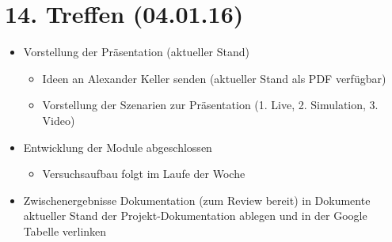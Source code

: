 \section{14. Treffen (04.01.16)}
\begin{itemize}
	\item Vorstellung der Präsentation (aktueller Stand)
	\begin{itemize}
		\item Ideen an Alexander Keller senden (aktueller Stand als PDF verfügbar)
		\item Vorstellung der Szenarien zur Präsentation (1. Live, 2. Simulation, 3. Video)
	\end{itemize}
	\item Entwicklung der Module abgeschlossen
	\begin{itemize}
		\item Versuchsaufbau folgt im Laufe der Woche
	\end{itemize}
	\item Zwischenergebnisse Dokumentation (zum Review bereit) in Dokumente \textrightarrow{ }aktueller Stand der Projekt-Dokumentation ablegen und in der Google Tabelle verlinken
\end{itemize}


